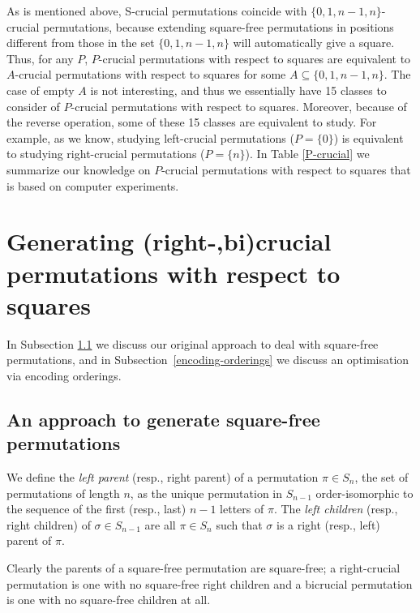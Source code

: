 \documentclass[12pt,reqno]{article}
\begin{document}
As is mentioned above, S-crucial permutations coincide with $\{0,1,n-1,n\}$-crucial permutations, because extending square-free permutations in positions different from those in the set  $\{0,1,n-1,n\}$ will automatically give a square. Thus, for any $P$,  $P$-crucial permutations with respect to squares are equivalent to $A$-crucial permutations with respect to squares for some $A\subseteq \{0,1,n-1,n\}$. The case of empty $A$ is not interesting, and thus we essentially have 15 classes to consider of $P$-crucial permutations with respect to squares. Moreover, because of the reverse operation, some of these 15 classes are equivalent to study. For example, as we know, studying left-crucial permutations ($P=\{0\}$) is equivalent to studying right-crucial permutations ($P=\{n\}$). In Table \ref{P-crucial} we summarize our knowledge on $P$-crucial permutations with respect to squares that is based on computer experiments.



\section{Generating (right-,bi)crucial permutations with respect to squares}\label{generating-perms}

In Subsection \ref{original-approach} we discuss our original approach to deal with square-free permutations, and in Subsection~\ref{encoding-orderings} we discuss an optimisation via encoding orderings. 

\subsection{An approach to generate square-free permutations}\label{original-approach}

We define the \textit{left parent} (resp., right parent) of a permutation $\pi\in S_n$, the set of permutations of length $n$, as the unique permutation in $S_{n-1}$ order-isomorphic to the sequence of the first (resp., last) $n-1$ letters of $\pi$. The \textit{left children} (resp., right children) of $\sigma\in S_{n-1}$  are all $\pi\in S_n$ such that $\sigma$ is a right (resp., left) parent of $\pi$.

Clearly the parents of a square-free permutation are square-free; a right-crucial permutation is one with no square-free right children and a bicrucial permutation is one with no square-free children at all. 
\end{document}
